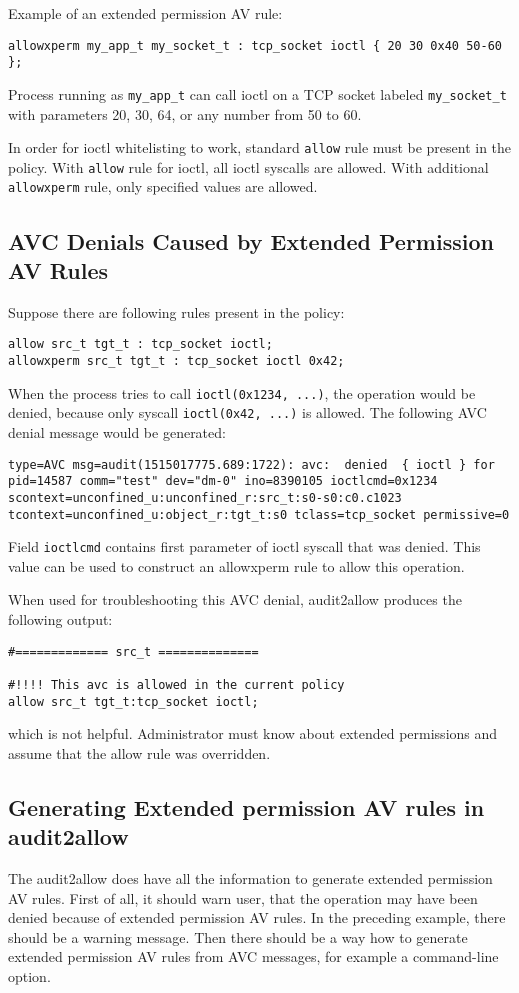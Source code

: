 Example of an extended permission AV rule:
\begin{lstlisting}
allowxperm my_app_t my_socket_t : tcp_socket ioctl { 20 30 0x40 50-60 };
\end{lstlisting}

Process running as \texttt{my\_app\_t} can call ioctl on a TCP socket labeled
\texttt{my\_socket\_t} with parameters 20, 30, 64, or any number from 50 to 60.

In order for ioctl whitelisting to work, standard \texttt{allow} rule must be
present in the policy. With \texttt{allow} rule for ioctl, all ioctl syscalls
are allowed. With additional \texttt{allowxperm} rule, only specified values are
allowed.

\subsection{AVC Denials Caused by Extended Permission AV Rules}
Suppose there are following rules present in the policy:
\begin{lstlisting}
allow src_t tgt_t : tcp_socket ioctl;
allowxperm src_t tgt_t : tcp_socket ioctl 0x42;
\end{lstlisting}
When the process tries to call \texttt{ioctl(0x1234, ...)}, the operation would
be denied, because only syscall \texttt{ioctl(0x42, ...)} is allowed. The
following AVC denial message would be generated:
\begin{lstlisting}
type=AVC msg=audit(1515017775.689:1722): avc:  denied  { ioctl } for
pid=14587 comm="test" dev="dm-0" ino=8390105 ioctlcmd=0x1234
scontext=unconfined_u:unconfined_r:src_t:s0-s0:c0.c1023
tcontext=unconfined_u:object_r:tgt_t:s0 tclass=tcp_socket permissive=0
\end{lstlisting}
Field \texttt{ioctlcmd} contains first parameter of ioctl syscall that was
denied. This value can be used to construct an allowxperm rule to allow this
operation.

When used for troubleshooting this AVC denial, audit2allow produces the
following output:
\begin{lstlisting}
#============= src_t ==============

#!!!! This avc is allowed in the current policy
allow src_t tgt_t:tcp_socket ioctl;
\end{lstlisting}
which is not helpful. Administrator must know about extended permissions and
assume that the allow rule was overridden.

\subsection{Generating Extended permission AV rules in audit2allow}
The audit2allow does have all the information to generate extended permission AV
rules. First of all, it should warn user, that the operation may have been
denied because of extended permission AV rules. In the preceding example, there
should be a warning message. Then there should be a way how to generate extended
permission AV rules from AVC messages, for example a command-line option.

